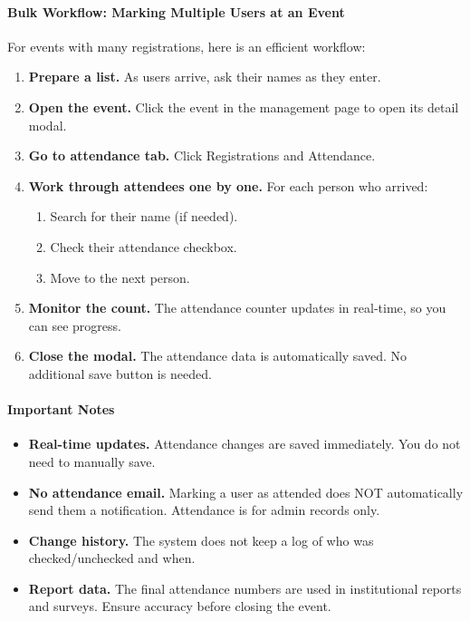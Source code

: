\documentclass[12pt, a4paper]{article}
\begin{document}
\paragraph{Bulk Workflow: Marking Multiple Users at an Event}

For events with many registrations, here is an efficient workflow:

\begin{enumerate}[leftmargin=1.5em]
  \item \textbf{Prepare a list.} As users arrive, ask their names as they enter.
  \item \textbf{Open the event.} Click the event in the management page to open its detail modal.
  \item \textbf{Go to attendance tab.} Click Registrations and Attendance.
  \item \textbf{Work through attendees one by one.} For each person who arrived:
    \begin{enumerate}
      \item Search for their name (if needed).
      \item Check their attendance checkbox.
      \item Move to the next person.
    \end{enumerate}
  \item \textbf{Monitor the count.} The attendance counter updates in real-time, so you can see progress.
  \item \textbf{Close the modal.} The attendance data is automatically saved. No additional save button is needed.
\end{enumerate}

\paragraph{Important Notes}

\begin{itemize}[leftmargin=1.5em]
  \item \textbf{Real-time updates.} Attendance changes are saved immediately. You do not need to manually save.
  \item \textbf{No attendance email.} Marking a user as attended does NOT automatically send them a notification. Attendance is for admin records only.
  \item \textbf{Change history.} The system does not keep a log of who was checked/unchecked and when.
  \item \textbf{Report data.} The final attendance numbers are used in institutional reports and surveys. Ensure accuracy before closing the event.
\end{itemize}
\end{document}

